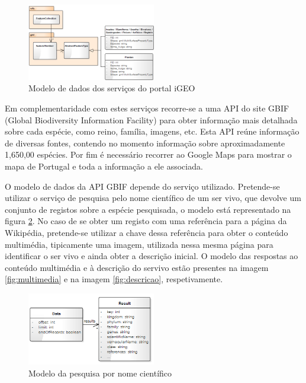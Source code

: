 \documentclass[twocolumn,twoside,11pt,a4paper]{article}
\begin{document}
\begin{figure}[ht!]
	\begin{center}
		\includegraphics[width=0.50\textwidth]{igeo}
		\caption{Modelo de dados dos serviços do portal iGEO}
		\label{fig:igeo}
	\end{center}
\end{figure} 


Em complementaridade com estes serviços recorre-se a uma API do site GBIF (Global Biodiversity Information Facility) para obter informação mais detalhada sobre cada espécie, como reino, família, imagens, etc. Esta API reúne informação de diversas fontes, contendo no momento informação sobre aproximadamente 1,650,00 espécies. Por fim é necessário recorrer ao Google Maps para mostrar o mapa de Portugal e toda a informação a ele associada.

	O modelo de dados da API GBIF depende do serviço utilizado. Pretende-se utilizar o serviço de pesquisa pelo nome científico de um ser vivo, que devolve um conjunto de registos sobre a espécie pesquisada, o modelo está representado na figura  \ref{fig:scientName}. No caso de se obter um registo com uma referência para a página da Wikipédia, pretende-se utilizar a chave dessa referência para obter o conteúdo multimédia, tipicamente uma imagem, utilizada nessa mesma página para identificar o ser vivo e ainda obter a descrição inicial. O modelo das respostas ao conteúdo multimédia e à descrição do servivo estão presentes na imagem \ref{fig:multimedia} e na imagem \ref{fig:descricao}, respetivamente.

\begin{figure}[ht!]
	\begin{center}
		\includegraphics[width=0.50\textwidth]{Scientify_name}
		\caption{Modelo da pesquisa por nome científico}
		\label{fig:scientName}
	\end{center}
\end{figure} 
\end{document}
